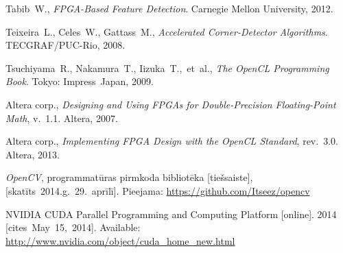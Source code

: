 {\begin{thebibliography}{99}
			Tabib~W.,
			\textit{FPGA-Based Feature Detection}.
			Carnegie Mellon University, 2012.
		
			Teixeira~L., Celes~W., Gattass~M.,
			\textit{Accelerated Corner-Detector Algorithms}.
			TECGRAF/PUC-Rio, 2008.
		
			Tsuchiyama~R., Nakamura~T., Iizuka~T.,~et~al.,
			\textit{The OpenCL Programming Book}. Tokyo: Impress~Japan, 2009.
		
			Altera corp., \textit{Designing and Using FPGAs for
				Double-Precision Floating-Point Math}, v.~1.1. Altera, 2007.
		
			Altera corp., \textit{Implementing FPGA Design with
				the OpenCL Standard}, rev.~3.0. Altera, 2013.
		
			\textit{OpenCV}, programmatūras pirmkoda bibliotēka [tiešsaiste],
			[skatīts~2014.g.~29.~aprīlī].
			Pieejama: \url{https://github.com/Itseez/opencv}
		
			NVIDIA CUDA Parallel Programming and Computing Platform [online].
			2014 [cites~May~15,~2014].
			Available: \url{http://www.nvidia.com/object/cuda_home_new.html}
	\end{thebibliography}
} %
